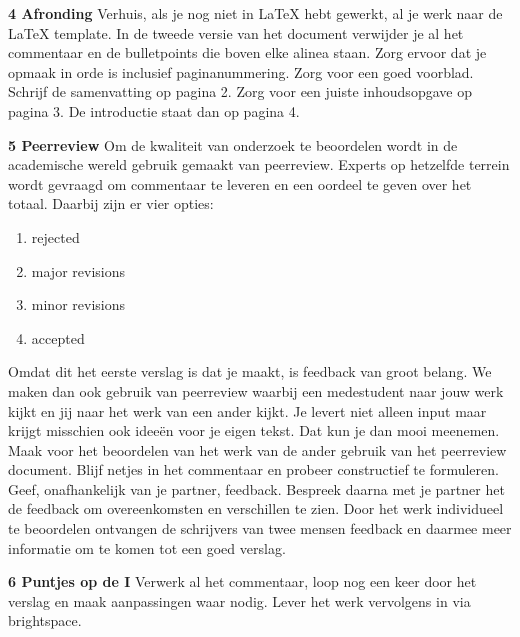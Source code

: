 %
\textbf{4	Afronding}
\newline
Verhuis, als je nog niet in LaTeX hebt gewerkt, al je werk naar de LaTeX template. In de tweede versie van het document verwijder je al het commentaar en de bulletpoints die boven elke alinea staan. Zorg ervoor dat je opmaak in orde is inclusief paginanummering. Zorg voor een goed voorblad. Schrijf de samenvatting op pagina 2. Zorg voor een juiste inhoudsopgave op pagina 3. De introductie staat dan op pagina 4. \newline

\textbf{5 Peerreview}
\newline
Om de kwaliteit van onderzoek te beoordelen wordt in de academische wereld gebruik gemaakt van peerreview. Experts op hetzelfde terrein wordt gevraagd om commentaar te leveren en een oordeel te geven over het totaal. Daarbij zijn er vier opties:
\begin{enumerate}
    \item rejected
    \item major revisions
    \item minor revisions
    \item accepted
\end{enumerate}
Omdat dit het eerste verslag is dat je maakt, is feedback van groot belang. We maken dan ook gebruik van peerreview waarbij een medestudent naar jouw werk kijkt en jij naar het werk van een ander kijkt. Je levert niet alleen input maar krijgt misschien ook idee\"{e}n voor je eigen tekst. Dat kun je dan mooi meenemen.\\

Maak voor het beoordelen van het werk van de ander gebruik van het peerreview document. Blijf netjes in het commentaar en probeer constructief te formuleren. Geef, onafhankelijk van je partner, feedback. Bespreek daarna met je partner het de feedback om overeenkomsten en verschillen te zien. Door het werk individueel te beoordelen ontvangen de schrijvers van twee mensen feedback en daarmee meer informatie om te komen tot een goed verslag.\newline

\textbf{6 Puntjes op de I}
\newline
Verwerk al het commentaar, loop nog een keer door het verslag en maak aanpassingen waar nodig. Lever het werk vervolgens in via brightspace.
